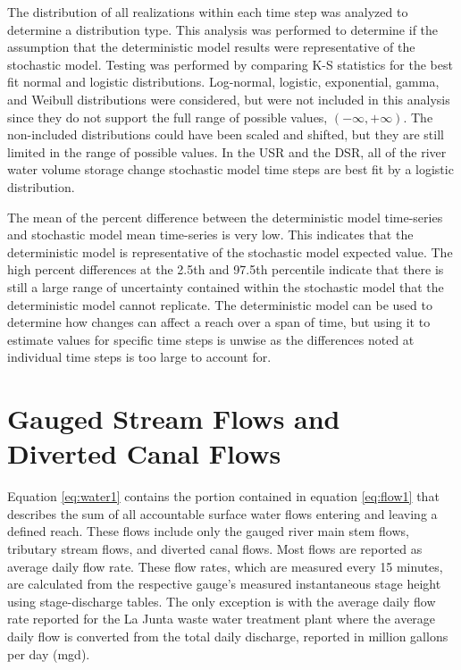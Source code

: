 The distribution of all realizations within each time step was analyzed to determine a distribution type.  This analysis was performed to determine if the assumption that the deterministic model results were representative of the stochastic model.   Testing was performed by comparing K-S statistics for the best fit normal and logistic distributions.  Log-normal, logistic, exponential, gamma, and Weibull distributions were considered, but were not included in this analysis since they do not support the full range of possible values, $ (-\infty, +\infty) $.  The non-included distributions could have been scaled and shifted, but they are still limited in the range of possible values.  In the USR and the DSR, all of the river water volume storage change stochastic model time steps are best fit by a logistic distribution.
  
The mean of the percent difference between the deterministic model time-series and stochastic model mean time-series is very low.  This indicates that the deterministic model is representative of the stochastic model expected value.  The high percent differences at the 2.5th and 97.5th percentile indicate that there is still a large range of uncertainty contained within the stochastic model that the deterministic model cannot replicate.  The deterministic model can be used to determine how changes can affect a reach over a span of time, but using it to estimate values for specific time steps is unwise as the differences noted at individual time steps is too large to account for.
\clearpage{}

\section{Gauged Stream Flows and Diverted Canal Flows}
\label{sec:StreamFlows}

Equation \ref{eq:water1} contains the portion contained in equation \ref{eq:flow1} that describes the sum of all accountable surface water flows entering and leaving a defined reach.  These flows include only the gauged river main stem flows, tributary stream flows, and diverted canal flows.  Most flows are reported as average daily flow rate.  These flow rates, which are measured every 15 minutes, are calculated from the respective gauge's measured instantaneous stage height using stage-discharge tables.  The only exception is with the average daily flow rate reported for the La Junta waste water treatment plant where the average daily flow is converted from the total daily discharge, reported in million gallons per day (mgd).

